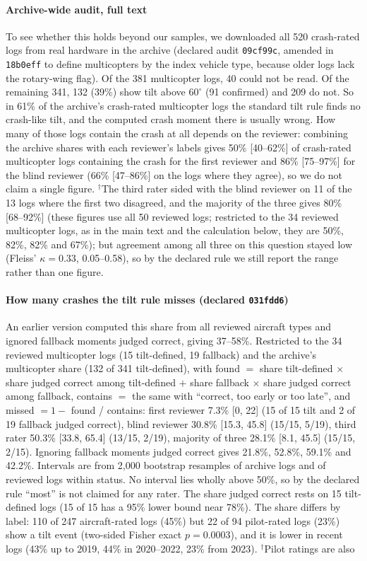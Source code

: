 \documentclass[preprint,12pt]{elsarticle}
\begin{document}
\paragraph{Archive-wide audit, full text} To see whether this holds beyond our samples, we downloaded all 520 crash-rated logs from real hardware in the archive (declared audit \texttt{09cf99c}, amended in \texttt{18b0eff} to define multicopters by the index vehicle type, because older logs lack the rotary-wing flag). Of the 381 multicopter logs, 40 could not be read. Of the remaining 341, 132 (39\%) show tilt above $60^\circ$ (91 confirmed) and 209 do not. So in 61\% of the archive's crash-rated multicopter logs the standard tilt rule finds no crash-like tilt, and the computed crash moment there is usually wrong. How many of those logs contain the crash at all depends on the reviewer: combining the archive shares with each reviewer's labels gives 50\% [40--62\%] of crash-rated multicopter logs containing the crash for the first reviewer and 86\% [75--97\%] for the blind reviewer (66\% [47--86\%] on the logs where they agree), so we do not claim a single figure. $^\dagger$The third rater sided with the blind reviewer on 11 of the 13 logs where the first two disagreed, and the majority of the three gives 80\% [68--92\%] (these figures use all 50 reviewed logs; restricted to the 34 reviewed multicopter logs, as in the main text and the calculation below, they are 50\%, 82\%, 82\% and 67\%); but agreement among all three on this question stayed low (Fleiss' $\kappa=0.33$, 0.05--0.58), so by the declared rule we still report the range rather than one figure. \paragraph{How many crashes the tilt rule misses (declared \texttt{031fdd6})} An earlier version computed this share from all reviewed aircraft types and ignored fallback moments judged correct, giving 37--58\%. Restricted to the 34 reviewed multicopter logs (15 tilt-defined, 19 fallback) and the archive's multicopter share (132 of 341 tilt-defined), with found $=$ share tilt-defined $\times$ share judged correct among tilt-defined $+$ share fallback $\times$ share judged correct among fallback, contains $=$ the same with ``correct, too early or too late'', and missed $= 1 -$ found / contains: first reviewer 7.3\% [0, 22] (15 of 15 tilt and 2 of 19 fallback judged correct), blind reviewer 30.8\% [15.3, 45.8] (15/15, 5/19), third rater 50.3\% [33.8, 65.4] (13/15, 2/19), majority of three 28.1\% [8.1, 45.5] (15/15, 2/15). Ignoring fallback moments judged correct gives 21.8\%, 52.8\%, 59.1\% and 42.2\%. Intervals are from 2,000 bootstrap resamples of archive logs and of reviewed logs within status. No interval lies wholly above 50\%, so by the declared rule ``most'' is not claimed for any rater. The share judged correct rests on 15 tilt-defined logs (15 of 15 has a 95\% lower bound near 78\%). The share differs by label: 110 of 247 aircraft-rated logs (45\%) but 22 of 94 pilot-rated logs (23\%) show a tilt event (two-sided Fisher exact $p=0.0003$), and it is lower in recent logs (43\% up to 2019, 44\% in 2020--2022, 23\% from 2023). $^\dagger$Pilot ratings are also 
\end{document}

